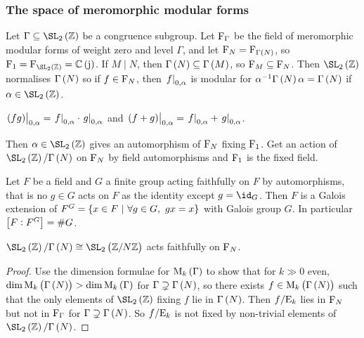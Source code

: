 \pagebreak

\subsubsection{The space of meromorphic modular forms}


Let $ \Gamma \subseteq \SL_2\br{\ZZ} $ be a congruence subgroup. Let $ \mathrm{F}_\Gamma $ be the field of meromorphic modular forms of weight zero and level $ \Gamma $, and let $ \F_N = \F_{\Gamma\br{N}} $, so $ \F_1 = \F_{\SL_2\br{\ZZ}} = \CC\br{\j} $. If $ M \mid N $, then $ \Gamma\br{N} \subseteq \Gamma\br{M} $, so $ \mathrm{F}_M \subseteq \mathrm{F}_N $. Then $ \SL_2\br{\ZZ} $ normalises $ \Gamma\br{N} $ so if $ f \in \mathrm{F}_N $, then $ \left. f \right|_{0, \alpha} $ is modular for $ \alpha^{-1}\Gamma\br{N}\alpha = \Gamma\br{N} $ if $ \alpha \in \SL_2\br{\ZZ} $.

\begin{note*}
$ \eval{\br{fg}}_{0, \alpha} = \eval{f}_{0, \alpha} \cdot \eval{g}_{0, \alpha} $ and $ \eval{\br{f + g}}_{0, \alpha} = \eval{f}_{0, \alpha} + \eval{g}_{0, \alpha} $.
\end{note*}

Then $ \alpha \in \SL_2\br{\ZZ} $ gives an automorphism of $ \mathrm{F}_N $ fixing $ \mathrm{F}_1 $. Get an action of $ \SL_2\br{\ZZ} / \Gamma\br{N} $ on $ \mathrm{F}_N $ by field automorphisms and $ \mathrm{F}_1 $ is the fixed field.

\begin{theorem}
Let $ F $ be a field and $ G $ a finite group acting faithfully on $ F $ by automorphisms, that is no $ g \in G $ acts on $ F $ as the identity except $ g = \id_G $. Then $ F $ is a Galois extension of $ F^G = \cbr{x \in F \st \forall g \in G, \ gx = x} $ with Galois group $ G $. In particular $ \sbr{F : F^G} = \#G $.
\end{theorem}

\begin{proposition}
$ \SL_2\br{\ZZ} / \Gamma\br{N} \cong \SL_2\br{\ZZ / N\ZZ} $ acts faithfully on $ \mathrm{F}_N $.
\end{proposition}

\begin{proof}
Use the dimension formulae for $ \M_k\br{\Gamma} $ to show that for $ k \gg 0 $ even, $ \dim \M_k\br{\Gamma\br{N}} > \dim \M_k\br{\Gamma} $ for $ \Gamma \supsetneq \Gamma\br{N} $, so there exists $ f \in \M_k\br{\Gamma\br{N}} $ such that the only elements of $ \SL_2\br{\ZZ} $ fixing $ f $ lie in $ \Gamma\br{N} $. Then $ f / \mathrm{E}_k $ lies in $ \mathrm{F}_N $ but not in $ \mathrm{F}_\Gamma $ for $ \Gamma \supsetneq \Gamma\br{N} $. So $ f / \mathrm{E}_k $ is not fixed by non-trivial elements of $ \SL_2\br{\ZZ} / \Gamma\br{N} $.
\end{proof}

